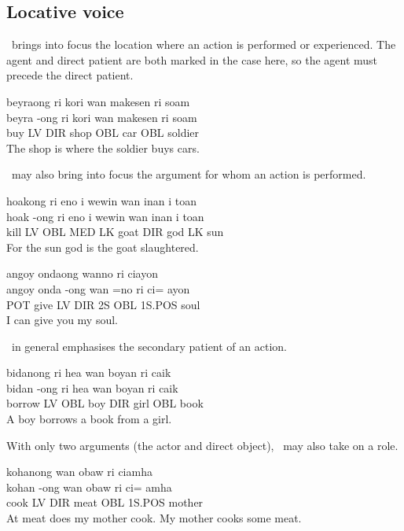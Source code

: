 \subsection{Locative voice}
\LV~brings into focus the location where an action is performed or experienced.
The agent and direct patient are both marked in the  case here,
so the agent must precede the direct patient.
\begin{examples}
	\ex
	\label{ex:carshop}
	\script beyraong ri kori wan makesen ri soam \\
	\bits beyra -ong ri kori wan makesen ri soam \\
	\gloss buy LV DIR shop OBL car OBL soldier  \\
	\tr The shop is where the soldier buys cars. \\
\end{examples}
\LV~may also bring into focus the argument for whom an action is performed.
\begin{examples}
	\ex
	\label{ex:slaughter}
	\script hoakong ri eno i wewin wan inan i toan \\
	\bits hoak -ong ri eno i wewin wan inan i toan \\
	\gloss kill LV OBL MED LK goat DIR god LK sun \\
	\tr For the sun god is the goat slaughtered.
\end{examples}
\begin{examples}
	\ex
	\label{ex:givecake}
	\script angoy ondaong wanno ri ciayon  \\
	\bits angoy onda -ong wan =no ri ci= ayon \\
	\gloss POT give LV DIR 2S OBL 1S.POS soul \\
	\tr I can give you my soul.
\end{examples}
\LV~in general emphasises the secondary patient of an action.
\begin{examples}
	\ex
	\label{ex:borrowbooks}
	\script bidanong ri hea wan boyan ri caik \\
	\bits bidan -ong ri hea wan boyan ri caik \\
	\gloss borrow LV OBL boy DIR girl OBL book \\
	\tr A boy borrows a book from a girl.
\end{examples}
With only two arguments (the actor and direct object), \LV~may also take
on a  role.
\begin{examples}
	\ex
	\label{ex:cookmeat}
	\script kohanong wan obaw ri ciamha \\
	\bits kohan -ong wan obaw ri ci= amha \\
	\gloss cook LV DIR meat OBL 1S.POS mother \\
	\tr At meat does my mother cook.
	\tr My mother cooks some meat.
\end{examples}


